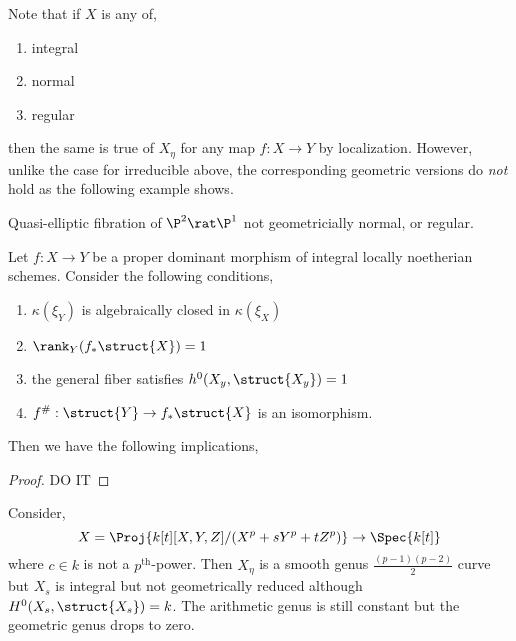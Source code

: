 \documentclass[12pt]{article}
\begin{document}
\begin{rmk}
Note that if $X$ is any of,
\begin{enumerate}
\item integral
\item normal
\item regular
\end{enumerate}
then the same is true of $X_\eta$ for any map $f : X \to Y$ by localization. However, unlike the case for irreducible above, the corresponding geometric versions do \textit{not} hold as the following example shows.
\end{rmk}

\begin{example}
Quasi-elliptic fibration of $\P^2 \rat \P^1$ not geometricially normal, or regular.
\end{example}


\begin{theorem}[Fujita 1982]
Let $f : X \to Y$ be a proper dominant morphism of integral locally noetherian schemes. Consider the following conditions,
\begin{enumerate}
\item $\kappa(\xi_Y)$ is algebraically closed in $\kappa(\xi_X)$

\item $\rank_Y (f_* \struct{X}) = 1$

\item the general fiber satisfies $h^0(X_y, \struct{X_y}) = 1$

\item $f^{\#} : \struct{Y} \to f_* \struct{X}$ is an isomorphism.
\end{enumerate}
Then we have the following implications,
\begin{center}
\end{center}
\end{theorem}

\begin{proof}
DO IT
\end{proof}

\begin{example}
Consider,
\[ X = \Proj{k[t][X,Y,Z]/(X^p + s Y^p + t Z^p)} \to \Spec{k[t]} \]
where $c \in k$ is not a $p^{\text{th}}$-power. Then $X_{\eta}$ is a smooth genus $\frac{(p-1)(p-2)}{2}$ curve but $X_s$ is integral but not geometrically reduced although $H^0(X_s, \struct{X_s}) = k$. The arithmetic genus is still constant but the geometric genus drops to zero.  
\end{example}
\end{document}
